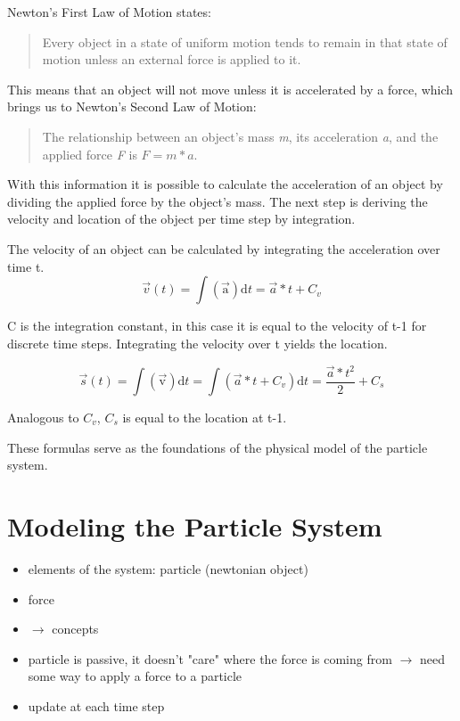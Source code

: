 \documentclass[runningheads,a4paper]{llncs}
\begin{document}
Newton's First Law of Motion states:
\begin{quotation}
Every object in a state of uniform motion tends to remain in that state of motion unless an external force is applied to it.
\end{quotation}

This means that an object will not move unless it is accelerated by a force, which brings us to Newton's Second Law of Motion:
\begin{quotation}
The relationship between an object's mass \emph{m}, its acceleration \emph{a}, and the applied force \emph{F} is $ F = m*a $.
\end{quotation}

With this information it is possible to calculate the acceleration of an object by dividing the applied force by the object's mass. The next step is deriving the velocity and location of the object per time step by integration.

The velocity of an object can be calculated by integrating the acceleration over time t. 
\begin{equation}
\overrightarrow{v}(t) = \int \mathrm{(\overrightarrow{a})} \mathrm{d}t = \overrightarrow{a}*t + C_v
\label{eq:vel}
\end{equation}

C is the integration constant, in this case it is equal to the velocity of t-1 for discrete time steps. Integrating the velocity over t yields the location.

\begin{equation}
\overrightarrow{s}(t) = \int \mathrm{(\overrightarrow{v})} \mathrm{d}t = \int (\overrightarrow{a}*t + C_v) \mathrm{d}t = \frac{\overrightarrow{a}*t^2}{2} + C_s
\label{eq:loc}
\end{equation}

Analogous to $C_v$, $C_s$ is equal to the location at t-1.

These formulas serve as the foundations of the physical model of the particle system. 

\section{Modeling the Particle System}
\begin{itemize}
\item elements of the system: particle (newtonian object)
\item force

\item $\rightarrow$ concepts

\item particle is passive, it doesn't "care" where the force is coming from $\rightarrow$ need some way to apply a force to a particle
\item update at each time step
\end{itemize}
\end{document}
